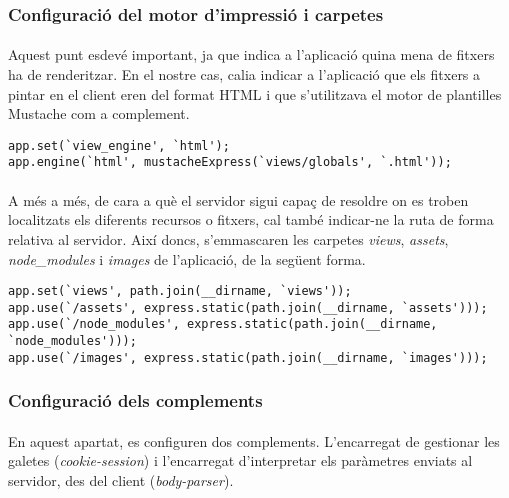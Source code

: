     \subsubsection{Configuració del motor d'impressió i carpetes}

    \paragraph{}
    Aquest punt esdevé important, ja que indica a l'aplicació quina mena de fitxers ha de renderitzar. En el nostre cas, calia indicar a l'aplicació que els fitxers a pintar en el client eren del format HTML i que s'utilitzava el motor de plantilles Mustache com a complement.

    \begin{lstlisting}[style=rawOwn,caption={Declaració del motor d'impressió}]
app.set(`view_engine', `html');
app.engine(`html', mustacheExpress(`views/globals', `.html'));
    \end{lstlisting}

    \paragraph{}
    A més a més, de cara a què el servidor sigui capaç de resoldre on es troben lo\-ca\-lit\-zats els diferents recursos o fitxers, cal també indicar-ne la ruta de forma relativa al servidor. Així doncs, s'emmascaren les carpetes \emph{views}, \emph{assets}, \emph{node\_modules} i \emph{images} de l'aplicació, de la següent forma.

    \begin{lstlisting}[style=rawOwn,caption={Configuració de les rutes a les carpetes amb fitxers}]
app.set(`views', path.join(__dirname, `views'));
app.use(`/assets', express.static(path.join(__dirname, `assets')));
app.use(`/node_modules', express.static(path.join(__dirname, `node_modules')));
app.use(`/images', express.static(path.join(__dirname, `images')));
    \end{lstlisting}


    \subsubsection{Configuració dels complements}

    \paragraph{}
    En aquest apartat, es configuren dos complements. L'encarregat de gestionar les galetes (\emph{cookie-session}) i l'encarregat d'interpretar els paràmetres enviats al servidor, des del client (\emph{body-parser}).

